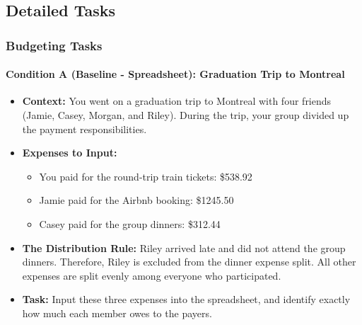 \documentclass[12pt,a4paper]{article}
\begin{document}
\begin{enumerate}
{\begin{enumerate}
        \end{enumerate}
        
    }

    
\end{enumerate}

\newpage
\subsection{Detailed Tasks}

\subsubsection{Budgeting Tasks}
\paragraph{Condition A (Baseline - Spreadsheet): Graduation Trip to Montreal}
\begin{itemize}
    \item \textbf{Context: }You went on a graduation trip to Montreal with four friends (Jamie, Casey, Morgan, and Riley). During the trip, your group divided up the payment responsibilities.
    
    \item {\textbf{Expenses to Input:}
    \begin{itemize}
        \item You paid for the round-trip train tickets: \$538.92
        \item Jamie paid for the Airbnb booking: \$1245.50
        \item Casey paid for the group dinners: \$312.44
    \end{itemize}
    }
    
    \item \textbf{The Distribution Rule:} Riley arrived late and did not attend the group dinners. Therefore, Riley is excluded from the dinner expense split. All other expenses are split evenly among everyone who participated.
    
    \item \textbf{Task:} Input these three expenses into the spreadsheet, and identify exactly how much each member owes to the payers.
\end{itemize}
\end{document}
